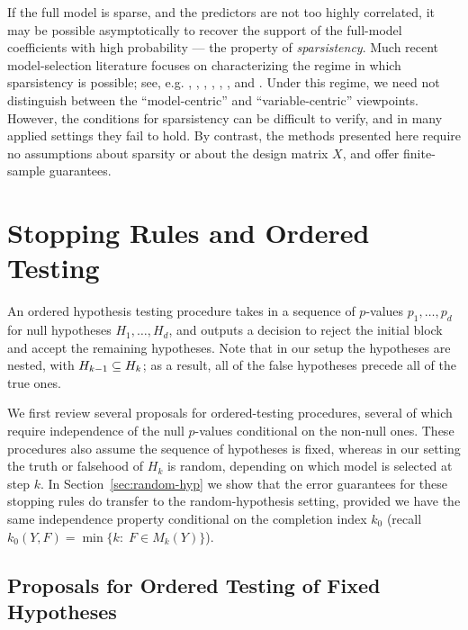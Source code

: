 \documentclass{article}
\begin{document}
If the full model is sparse, and the predictors are not too highly correlated, it may be possible asymptotically to recover the support of the full-model coefficients with high probability --- the property of {\em sparsistency}. Much recent model-selection literature focuses on characterizing the regime in which sparsistency is possible; see, e.g. \citet{bickel2009simultaneous}, \citet{meinshausen2006high}, \citet{negahban2009unified}, \citet{van2009conditions}, \citet{wainwright2009sharp}, \citet{zhao2006model}, and \citet{kozbur2015testing}. Under this regime, we need not distinguish between the ``model-centric'' and ``variable-centric'' viewpoints. However, the conditions for sparsistency can be difficult to verify, and in many applied settings they fail to hold. By contrast, the methods presented here require no assumptions about sparsity or about the design matrix $X$, and offer finite-sample guarantees.

\section{Stopping Rules and Ordered Testing}\label{sec:ordered}

An ordered hypothesis testing procedure takes in a sequence of $p$-values $p_1, \ldots, p_d$ for null hypotheses $H_{1}, \ldots, H_{d}$, and outputs a decision \smash{$\hk$} to reject the initial block  and accept the remaining hypotheses. Note that in our setup the hypotheses are nested, with $H_{k-1} \subseteq H_k$; as a result, all of the false hypotheses precede all of the true ones.

We first review several proposals for ordered-testing procedures, several of which require independence of the null $p$-values conditional on the non-null ones. These procedures also assume the sequence of hypotheses is fixed, whereas in our setting the truth or falsehood of $H_k$ is random, depending on which model is selected at step $k$. In Section~\ref{sec:random-hyp} we show that the error guarantees for these stopping rules do transfer to the random-hypothesis setting, provided we have the same independence property conditional on the completion index $k_0$ (recall 
$k_0(Y, F) = \min\{k:\; F \in M_k(Y)\}$).

\subsection{Proposals for Ordered Testing of Fixed Hypotheses}
\label{sec:orderedProposals}
\end{document}
